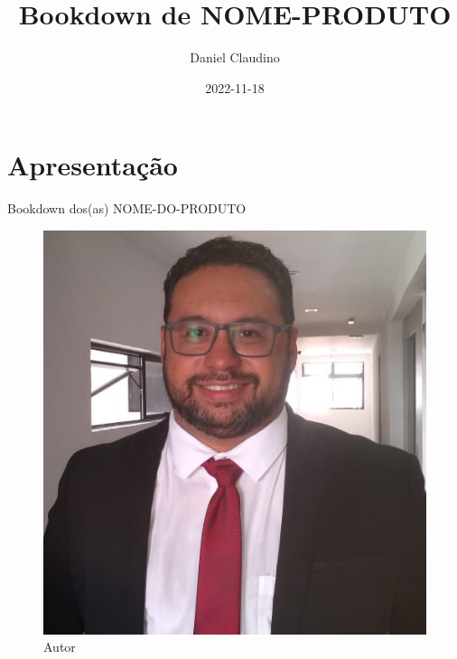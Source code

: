 \documentclass[
]{book}
\title{Bookdown de NOME-PRODUTO}
\author{Daniel Claudino}
\date{2022-11-18}
\begin{document}
\maketitle

{
\setcounter{tocdepth}{1}
\tableofcontents
}
\hypertarget{apresentauxe7uxe3o}{%
\chapter{Apresentação}\label{apresentauxe7uxe3o}}

Bookdown dos(as) NOME-DO-PRODUTO

\begin{figure}

{\centering \includegraphics[width=0.5\linewidth]{imagens/FOTO-PERFIL-DANIEL-CLAUDINO-2020} 

}

\caption{Autor}\label{fig:unnamed-chunk-1}
\end{figure}
\end{document}
